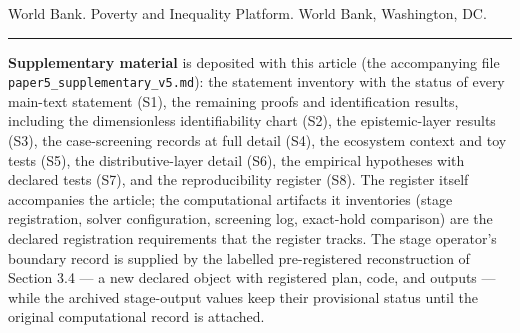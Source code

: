 \documentclass[11pt]{article}
\begin{document}
World Bank. Poverty and Inequality Platform. World Bank, Washington, DC.

\begin{center}\rule{0.5\linewidth}{0.5pt}\end{center}

\textbf{Supplementary material} is deposited with this article (the
accompanying file \texttt{paper5\_supplementary\_v5.md}): the statement
inventory with the status of every main-text statement (S1), the
remaining proofs and identification results, including the dimensionless
identifiability chart (S2), the epistemic-layer results (S3), the
case-screening records at full detail (S4), the ecosystem context and
toy tests (S5), the distributive-layer detail (S6), the empirical
hypotheses with declared tests (S7), and the reproducibility register
(S8). The register itself accompanies the article; the computational
artifacts it inventories (stage registration, solver configuration,
screening log, exact-hold comparison) are the declared registration
requirements that the register tracks. The stage operator's boundary
record is supplied by the labelled pre-registered reconstruction of
Section 3.4 --- a new declared object with registered plan, code, and
outputs --- while the archived stage-output values keep their
provisional status until the original computational record is attached.
\end{document}
